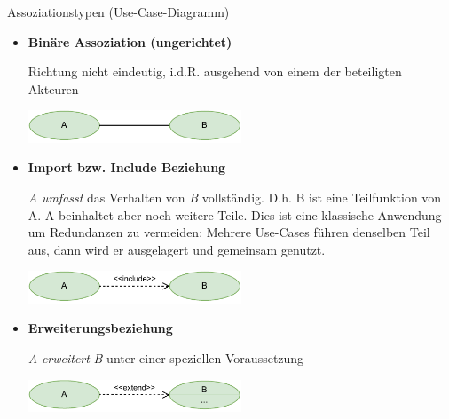 \begin{diag}{Assoziationstypen (Use-Case-Diagramm)}
    \begin{itemize}
        \item \textbf{Binäre Assoziation (ungerichtet)}

              Richtung nicht eindeutig, i.d.R. ausgehend von einem der beteiligten Akteuren

              \vspace{1em}
              \begin{center}
                  \includegraphics[width=0.5\textwidth]{includes/figures/defi_diagrams_use_case_assoziation.pdf}
              \end{center}

        \item \textbf{Import bzw. Include Beziehung}

              \emph{A} \emph{umfasst} das Verhalten von \emph{B} vollständig.
              D.h. B ist eine Teilfunktion von A.
              A beinhaltet aber noch weitere Teile.
              Dies ist eine klassische Anwendung um Redundanzen zu vermeiden:
              Mehrere Use-Cases führen denselben Teil aus, dann wird er ausgelagert und gemeinsam genutzt.

              \vspace{1em}
              \begin{center}
                  \includegraphics[width=0.5\textwidth]{includes/figures/defi_diagrams_use_case_include.pdf}
              \end{center}

        \item \textbf{Erweiterungsbeziehung}

              \emph{A} \emph{erweitert} \emph{B} unter einer speziellen Voraussetzung

              \vspace{1em}
              \begin{center}
                  \includegraphics[width=0.5\textwidth]{includes/figures/defi_diagrams_use_case_extend.pdf}
              \end{center}


\end{itemize}
\end{diag}
